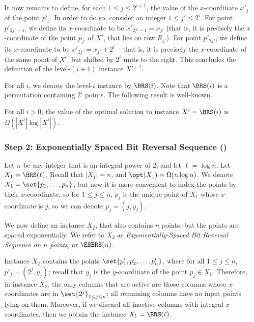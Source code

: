 \documentclass{toc}
\begin{document}
It now remains to define, for each $1\leq j\leq 2^{i+1}$, the value of the $x$-coordinate $x'_j$ of the point $p'_j$. In order to do so, consider an integer $1\leq j'\leq 2^{i}$. For point $p'_{2j'-1}$, we define its $x$-coordinate to be $x'_{2j'-1}=x_{j'}$ (that is, it is precisely the $x$-coordinate of the point $p_{j'}$ of $X^i$, that lies on row $R_{j'}$). For point $p'_{2j'}$, we define its $x$-coordinate to be $x'_{2j'}=x_{j'}+2^i$ -- that is, it is precisely the $x$-coordinate of the same point of $X^i$, but shifted by $2^i$ units to the right.
This concludes the definition of the level-$(i+1)$ instance $X^{i+1}$. 

For all $i$, we denote the level-$i$ instance by $\BRS(i)$. Note that $\BRS(i)$ is a permutation containing $2^i$ points.
The following result is well-known.   
 

\begin{claim}\label{claim: large opt for BRS}
	For all $i>0$, the value of the optimal solution to instance $X^i=\BRS(i)$ is $\Omega(|X^i|\log |X^i|)$.
\end{claim}


%
%
%
\subsubsection{Step 2: Exponentially Spaced Bit Reversal Sequence (\ESBRS)}
%
%
%


%

Let $n$ be any integer that is an integral power of $2$, and let $\ell=\log n$. Let $X_1=\BRS(\ell)$. Recall that $|X_1|=n$, and  $\opt(X_1)=\Omega(n\log n)$. We denote $X_1=\set{p_1,\ldots,p_n}$, but now it is more convenient to index the points by their $x$-coordinate, so for $1\leq j\leq n$, $p_j$ is the unique point of $X_1$ whose $x$-coordinate is $j$, so we can denote $p_j=(j,y_j)$.

We now define an instance $X_2$, that also contains $n$ points, but the points are spaced exponentially.
We refer to $X_2$ as \emph{Exponentially-Spaced Bit Reversal Sequence on $n$ points}, or $\ESBRS(n)$.

Instance $X_2$ contains the points $\set{p'_1,p'_2,\ldots,p'_n}$, where  for all $1\leq j\leq n$, $p'_j=(2^j,y_j)$; recall that $y_j$ is the $y$-coordinate of the point $p_j\in X_1$. Therefore, in instance $X_2$, the only columns that are active are those columns whose $x$-coordinates are in $\set{2^j}_{1\leq j\leq n}$; all remaining columns have no input points lying on them. Moreover, if we discard all inactive columns with integral $x$-coordinates, then we obtain the instance $X_1=\BRS(\ell)$.
\end{document}
